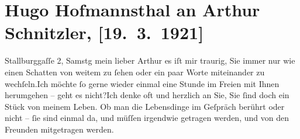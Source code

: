 

         
         \renewcommand{\erwaehntePersonen}{Personen: Frieda Pollak}
         \renewcommand{\erwaehnteOrte}{Orte: Gürtel, Hofmannsthal-Schlössl, Mauer, Maurer Berg, Rodaun, Stallburggasse, Wien}
         \renewcommand{\erwaehnteWerke}{}
               \section[Hugo Hofmannsthal an Arthur Schnitzler, {[}19. 3. 1921{]}]{ Hugo Hofmannsthal an Arthur Schnitzler, {[}19. 3. 1921{]}}\nopagebreak{}\rehead{ }\begin{ledgroupsized}[t]{13cm}\normalsize\beginnumbering \toendnotes[C]{\smallbreak\pagebreak[2]} 
\toendnotes[C]{\smallbreak}\pstart
           \raggedleft{}{\pb}Stallburggaſſe 2, Samstg\pend
           \pstart{}mein lieber Arthur\pend\pstart
           es iſt mir traurig, Sie immer nur wie einen Schatten von weitem zu ſehen oder ein
               paar Worte miteinander zu wechſeln.\hspace*{1.5em}Ich möchte ſo
               gerne wieder einmal eine Stunde im Freien mit Ihnen herumgehen – geht es nicht?\hspace*{1.5em}Ich denke oft und herzlich an Sie, Sie ſind doch ein
               Stück von meinem Leben. Ob man die Lebensdinge im Geſpräch berührt oder nicht – ſie
               sind einmal {\pb}da, und müſſen
               irgendwie getragen werden, und von den Freunden mitgetragen werden.\pend

\end{ledgroupsized}
